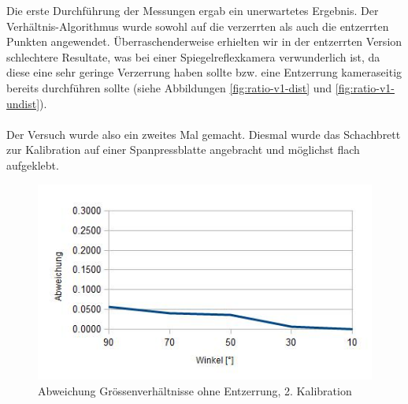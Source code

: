 \noindent
Die erste Durchführung der Messungen ergab ein unerwartetes Ergebnis. Der Verhältnis-Algorithmus wurde sowohl auf die verzerrten als auch die entzerrten Punkten angewendet. Überraschenderweise erhielten wir in der entzerrten Version schlechtere Resultate, was bei einer Spiegelreflexkamera verwunderlich ist, da diese eine sehr geringe Verzerrung haben sollte bzw. eine Entzerrung kameraseitig bereits durchführen sollte (siehe Abbildungen \ref{fig:ratio-v1-dist} und \ref{fig:ratio-v1-undist}).
\\
\\
Der Versuch wurde also ein zweites Mal gemacht. Diesmal wurde das Schachbrett zur Kalibration auf einer Spanpressblatte angebracht und möglichst flach aufgeklebt.


\begin{center}
\end{center}

\begin{figure}[!ht]
  \centering
  \includegraphics[width=0.75\linewidth]{images/ratio_v2_dist.jpg}
  \caption{Abweichung Grössenverhältnisse ohne Entzerrung, 2. Kalibration}
  \label{fig:ratio-v2-dist}
\end{figure}

